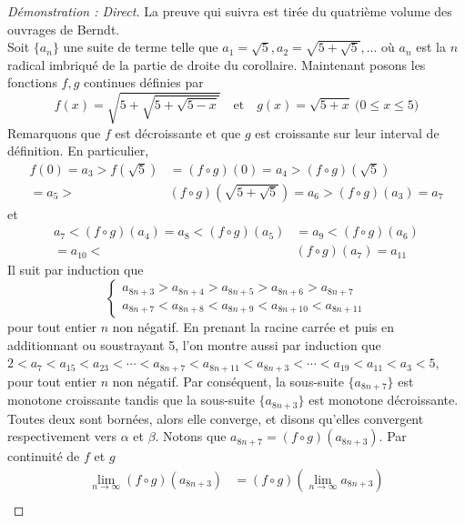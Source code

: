 \begin{proof}[Démonstration : Direct]
	La preuve qui suivra est tirée du quatrième volume des ouvrages de Berndt.\\
	Soit \(\{a_n\}\) une suite de terme telle que \(a_1=\sqrt{5}, a_2=\sqrt{5+\sqrt{5}},...\) où \(a_n\) est la \(n\)\ieme{} radical imbriqué de la partie de droite du corollaire. Maintenant posons les fonctions \(f,g\) continues définies par
	\[
	f(x)=\sqrt{5+\sqrt{5+\sqrt{5-x}}}\quad\text{et}\quad g(x)=\sqrt{5+x}\pod{0\leq x\leq 5}
	\]
	Remarquons que \(f\) est décroissante et que \(g\) est croissante sur leur interval de définition. En particulier,
	\begin{align*}
		f(0)=a_3>f\left(\sqrt{5}\right)&=(f\circ g)(0) = a_4>(f\circ g)\left(\sqrt{5}\right)\\
		=a_5>&(f\circ g)\left(\sqrt{5+\sqrt{5}}\right)=a_6>(f\circ g)(a_3)=a_7
	\end{align*}
	et 
	\begin{align*}
		a_7<(f\circ g)(a_4)=a_8<(f\circ g)(a_5)&=a_9<(f\circ g)(a_6)\\
		=a_{10}<&(f\circ g)(a_7)=a_{11}
	\end{align*}
	Il suit par induction que 
	\begin{equation}\label{eq:inequalities}
		\begin{cases}{}
			a_{8n+3}>a_{8n+4}>a_{8n+5}>a_{8n+6}>a_{8n+7}\\
			a_{8n+7}<a_{8n+8}<a_{8n+9}<a_{8n+10}<a_{8n+11}
		\end{cases}
	\end{equation}
	pour tout entier \(n\) non négatif. En prenant la racine carrée et puis en additionnant ou soustrayant 5, l'on montre aussi par induction que
	\(2<a_7<a_{15}<a_{23}<\cdots<a_{8n+7}<a_{8n+11}<a_{8n+3}<\cdots<a_{19}<a_{11}<a_3<5\), pour tout entier \(n\) non négatif. Par conséquent, la sous-suite \(\{a_{8n+7}\}\) est monotone croissante tandis que la sous-suite \(\{a_{8n+3}\}\) est monotone décroissante. Toutes deux sont bornées, alors elle converge, et disons qu'elles convergent respectivement vers \(\alpha\) et \(\beta\). Notons que \(a_{8n+7}=(f\circ g)(a_{8n+3})\). Par continuité de \(f\) et \(g\)
	\begin{align*}
		\lim_{n\to\infty}(f\circ g)(a_{8n+3}) & =(f\circ g)\left(\lim_{n\to\infty}a_{8n+3}\right) \\

\end{align*}
\end{proof}
